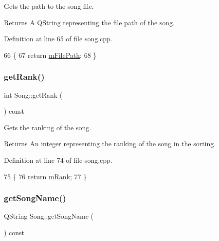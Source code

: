 Gets the path to the song file. 

\begin{DoxyReturn}{Returns}
A Q\+String representing the file path of the song. 
\end{DoxyReturn}


Definition at line 65 of file song.\+cpp.


\begin{DoxyCode}
66 \{
67     \textcolor{keywordflow}{return} \mbox{\hyperlink{class_song_af6852312a9369340908b7726d97979a6}{mFilePath}};
68 \}
\end{DoxyCode}
\mbox{\label{class_song_ab80f9bd4c1b971be3daa0df1aaa2bc89}} 
\subsubsection{\texorpdfstring{get\+Rank()}{getRank()}}
{\footnotesize\ttfamily int Song\+::get\+Rank (\begin{DoxyParamCaption}{ }\end{DoxyParamCaption}) const}



Gets the ranking of the song. 

\begin{DoxyReturn}{Returns}
An integer representing the ranking of the song in the sorting. 
\end{DoxyReturn}


Definition at line 74 of file song.\+cpp.


\begin{DoxyCode}
75 \{
76     \textcolor{keywordflow}{return} \mbox{\hyperlink{class_song_a18b47d2545fc5e7795cad143092c97e7}{mRank}};
77 \}
\end{DoxyCode}
\mbox{\label{class_song_a9507aeaa55d6c31f829e42432f6b5de3}} 
\subsubsection{\texorpdfstring{get\+Song\+Name()}{getSongName()}}
{\footnotesize\ttfamily Q\+String Song\+::get\+Song\+Name (\begin{DoxyParamCaption}{ }\end{DoxyParamCaption}) const}



